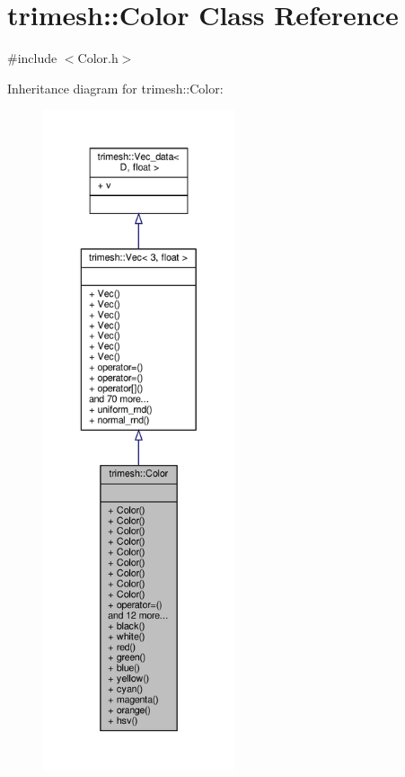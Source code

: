 \hypertarget{classtrimesh_1_1Color}{}\section{trimesh\+:\+:Color Class Reference}
\label{classtrimesh_1_1Color}


{\ttfamily \#include $<$Color.\+h$>$}



Inheritance diagram for trimesh\+:\+:Color\+:\nopagebreak
\begin{figure}[H]
\begin{center}
\leavevmode
\includegraphics[height=550pt]{dd/db1/classtrimesh_1_1Color__inherit__graph}
\end{center}
\end{figure}


